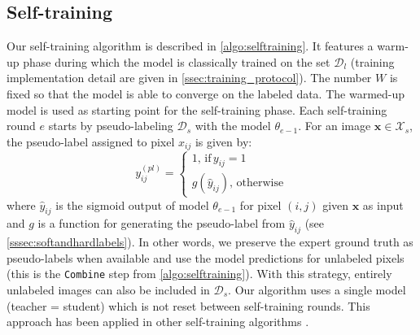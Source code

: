 \subsection{Self-training}
\label{ssec:self_training}
 
Our self-training algorithm is described in \cref{algo:selftraining}. It features a warm-up phase during which the model is classically trained on the set $\mathcal{D}_l$ (training implementation detail are given in \cref{ssec:training_protocol}). The number $W$ is fixed so that the model is able to converge on the labeled data. The warmed-up model is used as starting point for the self-training phase. Each self-training round $e$ starts by pseudo-labeling $\mathcal{D}_s$ with the model $\theta_{e-1}$. For an image $\mathbf{x} \in \mathcal{X}_s$, the pseudo-label assigned to pixel $x_{ij}$ is given by:
\begin{equation}
y^{({pl})}_{ij} = \begin{cases}
1,\,\text{if}\, y_{ij} = 1 \\
g(\hat{y}_{ij}),\,\text{otherwise}
\end{cases}
\label{eqn:pseudolabeling}
\end{equation}
where $\hat{y}_{ij}$ is the sigmoid output of model $\theta_{e-1}$ for pixel $(i, j)$ given $\mathbf{x}$ as input and $g$ is a function for generating the pseudo-label from $\hat{y}_{ij}$ (see \cref{sssec:softandhardlabels}). In other words, we preserve the expert ground truth as pseudo-labels when available and use the model predictions for unlabeled pixels (this is the \texttt{Combine} step from \cref{algo:selftraining}). With this strategy, entirely unlabeled images can also be included in $\mathcal{D}_s$. Our algorithm uses a single model (\ie teacher = student) which is not reset between self-training rounds. This approach has been applied in other self-training algorithms \cite{laine2016temporal, bai2017semi, li2018based}. 

